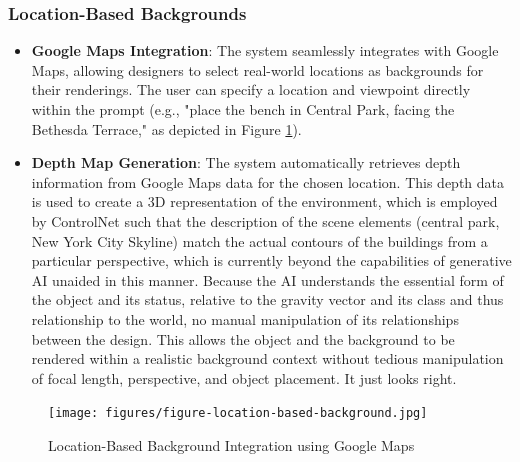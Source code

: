 \documentclass[12pt]{article}
\begin{document}
\subsubsection{Location-Based Backgrounds}
\begin{itemize}
\item \textbf{Google Maps Integration}: The system seamlessly integrates with Google Maps, allowing designers to select real-world locations as backgrounds for their renderings. The user can specify a location and viewpoint directly within the prompt (e.g., "place the bench in Central Park, facing the Bethesda Terrace," as depicted in Figure \ref{fig:location-based-background}).

\item \textbf{Depth Map Generation}: The system automatically retrieves depth information from Google Maps data for the chosen location. This depth data is used to create a 3D representation of the environment, which is employed by ControlNet such that the description of the scene elements (central park, New York City Skyline) match the actual contours of the buildings from a particular perspective, which is currently beyond the capabilities of generative AI unaided in this manner. Because the AI understands the essential form of the object and its status, relative to the gravity vector and its class and thus relationship to the world, no manual manipulation of its relationships between the design. This allows the object and the background to be rendered within a realistic background context without tedious manipulation of focal length, perspective, and object placement. It just looks right.
\end{itemize}

\begin{figure}[h]
    \centering
    \texttt{[image: figures/figure-location-based-background.jpg]}
    \caption{Location-Based Background Integration using Google Maps}
    \label{fig:location-based-background}
\end{figure}


\end{document}

